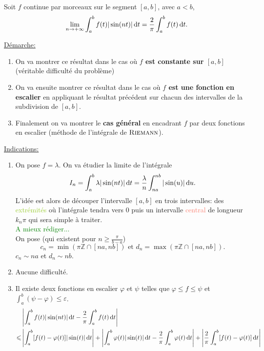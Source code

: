 \begin{prop}
    Soit $f$ continue par morceaux sur le segment $[a,b]$, avec $a < b$,
    $$\lim_{n \to +\infty} \int_{a}^{b} f(t) | \sin (nt) | \, \mathrm{d} t = \frac{2}{\pi} \int_{a}^{b} f(t) \, \mathrm{d} t.$$
\end{prop}
    
\underline{Démarche:}
\begin{enumerate}[noitemsep]
    \item On va montrer ce résultat dans le cas où \textbf{$f$ est constante sur $[a, b]$} (véritable difficulté du problème) 
    \item On va ensuite montrer ce résultat dans le cas où \textbf{$f$ est une fonction en escalier} en appliquant le résultat précédent sur chacun des intervalles de la subdivision de $[a, b]$.
    \item Finalement on va montrer le \textbf{cas général} en encadrant $f$ par deux fonctions en escalier (méthode de l'intégrale de $\textsc{Riemann}$).
\end{enumerate}
\underline{Indications:}
\begin{enumerate}[noitemsep]
    \item On pose $f = \lambda$. On va étudier la limite de l'intégrale
    $$I_n = \int_{a}^{b} \lambda | \sin(nt) | \, \mathrm{d} t = \frac{\lambda}{n} \int_{na}^{nb} | \sin(u) | \, \mathrm{d} u.$$
    L'idée est alors de découper l'intervalle $[a, b]$ en trois intervalles: des \textcolor{YellowGreen}{extrémités} où l'intégrale tendra vers $0$ puis un intervalle \textcolor{Salmon}{central} de longueur $k_n \pi$ qui sera simple à traiter. \\
    \textcolor{green}{A mieux rédiger...} \\
    On pose (qui existent pour $n \geqslant \frac{\pi}{b-a}$)
    $$c_n = \min( \pi \mathbb{Z} \cap [na, nb]) \text{ et } d_n = \max( \pi \mathbb{Z} \cap [na, nb]).$$
    $c_n \sim na$ et $d_n \sim nb$. 
    \item Aucune difficulté.
    \item Il existe deux fonctions en escalier $\varphi$ et $\psi$ telles que $\varphi \leqslant f \leqslant \psi$ et $\int_{a}^{b} (\psi - \varphi) \leqslant \varepsilon$.
    \begin{align*}
        & \left | \int_{a}^{b} f(t) | \sin (nt) | \, \mathrm{d} t - \frac{2}{\pi} \int_{a}^{b} f(t) \, \mathrm{d} t \right| \\
        \leqslant & \left | \int_{a}^{b} [f(t) - \varphi(t) ] | \sin(t) | \, \mathrm{d} t \right| + \left | \int_{a}^{b} \varphi(t) |\sin(t)| \, \mathrm{d} t - \frac{2}{\pi} \int_{a}^{b} \varphi(t) \, \mathrm{d} t \right| + \left| \frac{2}{\pi} \int_{a}^{b} [f(t) - \varphi(t)] \, \mathrm{d} t \right|
    \end{align*}
\end{enumerate}